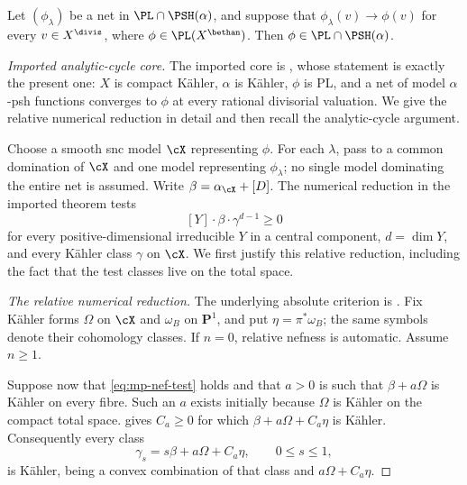 \begin{theorem}\label{thm:mp-model-closedness}
Let $(\phi_\lambda)$ be a net in
$\PL\cap\PSH(\alpha)$, and suppose that
$\phi_\lambda(v)\to\phi(v)$ for every $v\in X^{\divis}$, where
$\phi\in\PL(X^{\bethan})$.  Then
$\phi\in\PL\cap\PSH(\alpha)$.
\end{theorem}

\begin{proof}[Imported analytic-cycle core]
The imported core is \cite[Theorem~4.1.5, pp.~34--35]{MPTropicalV2}, whose
statement is exactly the present one: $X$ is compact K\"ahler, $\alpha$
is K\"ahler, $\phi$ is PL, and a net of model $\alpha$-psh functions
converges to $\phi$ at every rational divisorial valuation.  We give the
relative numerical reduction in detail and then recall the analytic-cycle
argument.

Choose a smooth snc model $\cX$ representing $\phi$.  For each
$\lambda$, pass to a common domination of $\cX$ and one model
representing $\phi_\lambda$; no single model dominating the entire net is
assumed.  Write $\beta=\alpha_{\cX}+[D]$.  The numerical reduction in the
imported theorem tests
\[
 [Y]\cdot\beta\cdot\gamma^{d-1}\geq0
\tag{60.6}\label{eq:mp-nef-test}
\]
for every positive-dimensional irreducible $Y$ in a central component,
$d=\dim Y$, and every K\"ahler class $\gamma$ on $\cX$.  We first justify
this relative reduction, including the fact that the test classes live on
the total space.

\emph{The relative numerical reduction.}
The underlying absolute criterion is
\cite[Theorem~4.3(iii), Corollary~0.4]{DP04}.  Fix K\"ahler forms
$\Omega$ on $\cX$ and $\omega_B$ on $\mathbf P^1$, and put
$\eta=\pi^*\omega_B$; the same symbols denote their cohomology classes.
If $n=0$, relative nefness is automatic.  Assume $n\geq1$.

Suppose now that \eqref{eq:mp-nef-test} holds and that $a>0$ is such that
$\beta+a\Omega$ is K\"ahler on every fibre.  Such an $a$ exists initially
because $\Omega$ is K\"ahler on the compact total space.
 gives $C_a\geq0$ for which
$\beta+a\Omega+C_a\eta$ is K\"ahler.  Consequently every class
\[
 \gamma_s=s\beta+a\Omega+C_a\eta,\qquad 0\leq s\leq1,
\]
is K\"ahler, being a convex combination of that class and
$a\Omega+C_a\eta$.


\end{proof}
